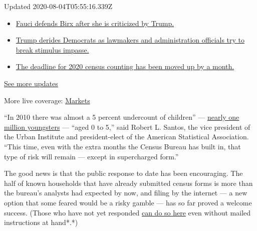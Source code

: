 Updated 2020-08-04T05:55:16.339Z

\begin{itemize}
\tightlist
\item
  \href{https://www.nytimes.com/2020/08/03/world/coronavirus-covid-19.html?action=click\&pgtype=Article\&state=default\&region=MAIN_CONTENT_1\&context=storylines_live_updates\#link-4547638f}{Fauci
  defends Birx after she is criticized by Trump.}
\item
  \href{https://www.nytimes.com/2020/08/03/world/coronavirus-covid-19.html?action=click\&pgtype=Article\&state=default\&region=MAIN_CONTENT_1\&context=storylines_live_updates\#link-15e7f995}{Trump
  derides Democrats as lawmakers and administration officials try to
  break stimulus impasse.}
\item
  \href{https://www.nytimes.com/2020/08/03/world/coronavirus-covid-19.html?action=click\&pgtype=Article\&state=default\&region=MAIN_CONTENT_1\&context=storylines_live_updates\#link-e5a2cda}{The
  deadline for 2020 census counting has been moved up by a month.}
\end{itemize}

\href{https://www.nytimes.com/2020/08/03/world/coronavirus-covid-19.html?action=click\&pgtype=Article\&state=default\&region=MAIN_CONTENT_1\&context=storylines_live_updates}{See
more updates}

More live coverage:
\href{https://www.nytimes.com/live/2020/08/03/business/stock-market-today-coronavirus?action=click\&pgtype=Article\&state=default\&region=MAIN_CONTENT_1\&context=storylines_live_updates}{Markets}

``In 2010 there was almost a 5 percent undercount of children'' ---
\href{https://www.census.gov/content/dam/Census/library/working-papers/2014/demo/2014-undercount-children.pdf}{nearly
one million youngsters} --- ``aged 0 to 5,'' said Robert L. Santos, the
vice president of the Urban Institute and president-elect of the
American Statistical Association. ``This time, even with the extra
months the Census Bureau has built in, that type of risk will remain ---
except in supercharged form.''

The good news is that the public response to date has been encouraging.
The half of known households that have already submitted census forms is
more than the bureau's analysts had expected by now, and filing by the
internet --- a new option that some feared would be a risky gamble ---
has so far proved a welcome success. (Those who have not yet responded
\href{https://2020census.gov}{can do so here} even without mailed
instructions at hand*.*)

